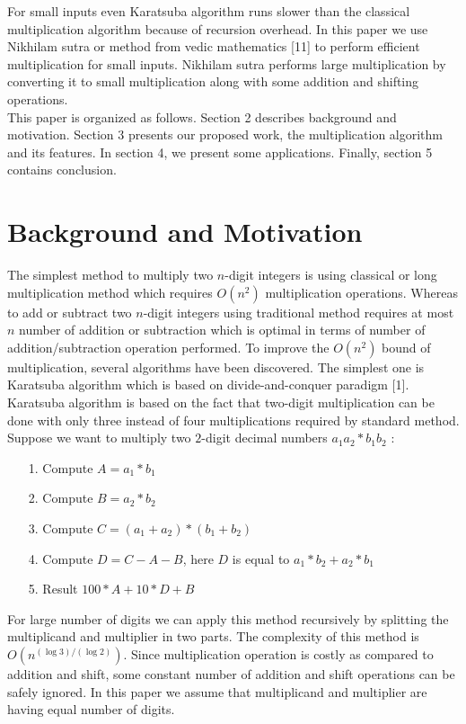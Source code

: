 \documentclass[conference]{IEEEtran}
\begin{document}
For small inputs even Karatsuba algorithm runs slower than the classical multiplication algorithm because of recursion overhead. In this paper we use Nikhilam sutra or method from vedic mathematics [11] to perform efficient multiplication for small inputs. Nikhilam sutra performs large multiplication by converting it to small multiplication along with some addition and shifting operations. \\
\indent This paper is organized as follows. Section 2 describes background and motivation. Section 3 presents our proposed work, the multiplication algorithm and its features. In section 4, we present some applications. Finally, section 5 contains conclusion.


\section{Background and Motivation}
The simplest method to multiply two $n$-digit integers is using classical or long multiplication method which requires
$O(n^{2})$ multiplication operations. Whereas to add or subtract two $n$-digit integers using traditional method requires at most $n$ number of addition or subtraction which is optimal in terms of number of addition/subtraction operation performed. To improve the $O(n^{2})$ bound of multiplication, several algorithms have been discovered.  The simplest one is Karatsuba algorithm which is based on divide-and-conquer paradigm [1]. Karatsuba algorithm is based on the fact that two-digit multiplication can be done with only three instead of four multiplications required by standard method. Suppose we want to multiply two $2$-digit decimal numbers $a_1a_2 * b_1b_2$ :
\begin{enumerate}
 \item[1.] Compute $A = a_1*b_1$
 \item[2.] Compute $B = a_2*b_2$
 \item[3.] Compute $C = (a_1 + a_2)*(b_1 + b_2)$
 \item[4.] Compute $D = C-A-B$, here $D$ is equal to $a_1*b_2 + a_2*b_1$
 \item[5.] Result  $100*A + 10*D +B$
\end{enumerate}
For large number of digits we can apply this method recursively by splitting the multiplicand and multiplier in two parts. The complexity of this method is $O(n^{(\log 3)/(\log 2)})$. Since multiplication operation is costly as compared to addition and shift, some constant number of addition and shift operations can be safely ignored. In this paper we assume that multiplicand and multiplier are having equal number of digits.\\
\end{document}
